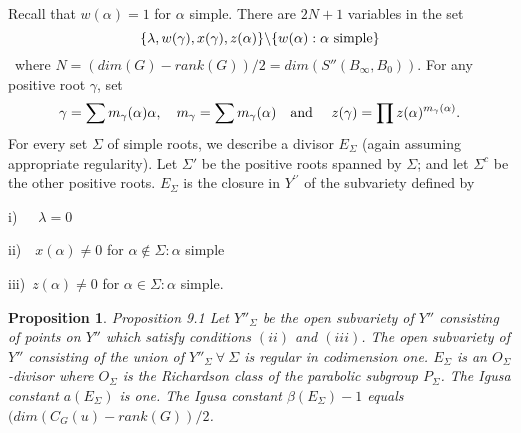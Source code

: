 \documentclass{memo-l}
\newtheorem{proposition}[theorem]{Proposition}
\theoremstyle{definition}
\theoremstyle{remark}
\numberwithin{section}{chapter}
\numberwithin{equation}{chapter}
\begin{document}
   Recall that $w({\alpha})=1$ for ${\alpha}$ simple. 
 There are $2N+1$ variables in the set 
 $$
 \{{\lambda},w({\gamma}),x({\gamma}),
z(\alpha)\}\backslash \{w(\alpha) : {\alpha} \hbox{ simple}\}
$$
\ where  $N = 
(dim(G)-rank(G))/2 = dim(S''(B_{{\infty}},B_{0}))$. 
 For any positive root ${\gamma}$, set 
 $${\gamma}=\sum m_{{\gamma}}
({\alpha}){\alpha}, \quad m_{{\gamma}}=\sum m_{{\gamma}}({\alpha}) 
\quad\hbox{and }\quad 
z({\gamma}) = \prod z({\alpha})^{m_\gamma(\alpha)}.$$
For every set
${\Sigma}$ of simple roots, we describe a divisor $E_{{\Sigma}}$ (again 
assuming appropriate regularity). 
 Let ${\Sigma}'$ be the positive roots spanned by ${\Sigma}$; and let 
${\Sigma}^{c}$ be the other positive roots. 
 $E_{{\Sigma}}$ is the closure in $Y^{\prime\prime}$ of the subvariety defined by

   i)\ \ \  ${\lambda}=0$   

   ii)\ \    $x({\alpha})\ne 0$ for ${\alpha} \notin  {\Sigma} : {\alpha}$ 
simple

   iii)\   $z({\alpha})\ne 0$ for ${\alpha} \in {\Sigma} : {\alpha}$ simple.



\begin{proposition}{Proposition 9.1}   Let $Y''_{{\Sigma}}$ be the open subvariety of $Y''$ 
consisting of points on $Y''$ which satisfy conditions $(ii)$ and $(iii)$. 
 The open subvariety of $Y''$ consisting of the union of $Y''_{{\Sigma}} {\
\forall\ } {\Sigma}$ is regular in codimension one. 
 $E_{{\Sigma}}$ is an $O_{{\Sigma}}$-divisor where $O_{{\Sigma}}$ is the 
Richardson class of the parabolic subgroup $P_{{\Sigma}}$. 
 The Igusa constant $a(E_{{\Sigma}})$ is one. 
 The Igusa constant ${\beta}(E_{{\Sigma}})-1$ equals $(dim(C_{G}(u)-rank(G))/2$.
\end{proposition}
\end{document}
